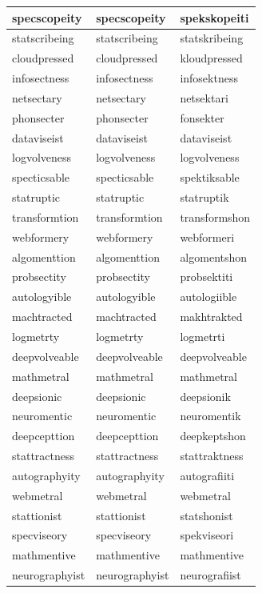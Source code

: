 \documentclass[10pt,twocolumn,letterpaper]{article}
\begin{document}
\begin{longtable}{|p{4cm}|p{4cm}|p{4cm}|}
specscopeity & specscopeity & spekskopeiti \\ \hline
statscribeing & statscribeing & statskribeing \\ \hline
cloudpressed & cloudpressed & kloudpressed \\ \hline
infosectness & infosectness & infosektness \\ \hline
netsectary & netsectary & netsektari \\ \hline
phonsecter & phonsecter & fonsekter \\ \hline
dataviseist & dataviseist & dataviseist \\ \hline
logvolveness & logvolveness & logvolveness \\ \hline
specticsable & specticsable & spektiksable \\ \hline
statruptic & statruptic & statruptik \\ \hline
transformtion & transformtion & transformshon \\ \hline
webformery & webformery & webformeri \\ \hline
algomenttion & algomenttion & algomentshon \\ \hline
probsectity & probsectity & probsektiti \\ \hline
autologyible & autologyible & autologiible \\ \hline
machtracted & machtracted & makhtrakted \\ \hline
logmetrty & logmetrty & logmetrti \\ \hline
deepvolveable & deepvolveable & deepvolveable \\ \hline
mathmetral & mathmetral & mathmetral \\ \hline
deepsionic & deepsionic & deepsionik \\ \hline
neuromentic & neuromentic & neuromentik \\ \hline
deepcepttion & deepcepttion & deepkeptshon \\ \hline
stattractness & stattractness & stattraktness \\ \hline
autographyity & autographyity & autografiiti \\ \hline
webmetral & webmetral & webmetral \\ \hline
stattionist & stattionist & statshonist \\ \hline
specviseory & specviseory & spekviseori \\ \hline
mathmentive & mathmentive & mathmentive \\ \hline
neurographyist & neurographyist & neurografiist \\ \hline

\end{longtable}
\end{document}

